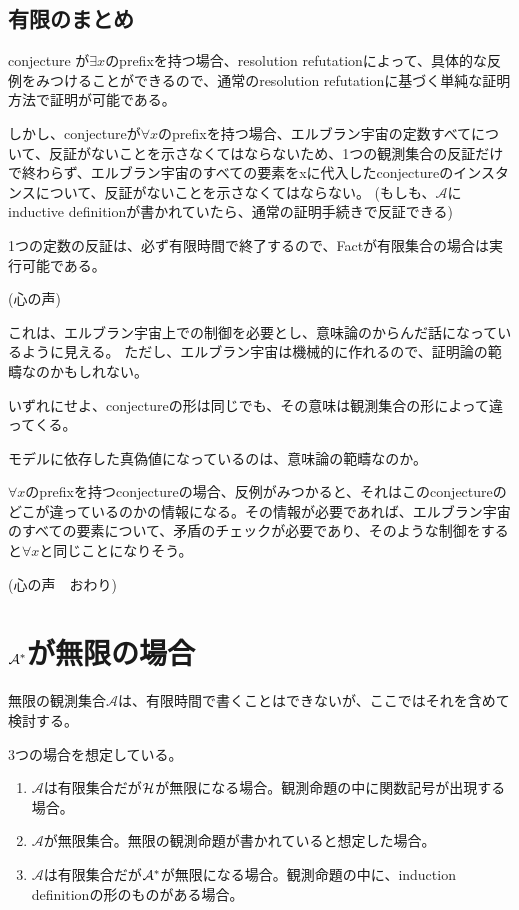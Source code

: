 \documentclass[10pt, oneside]{jarticle}   	%
\begin{document}
\subsection{有限のまとめ}
conjecture が$\exists x $のprefixを持つ場合、resolution refutationによって、具体的な反例をみつけることができるので、通常のresolution refutationに基づく単純な証明方法で証明が可能である。

しかし、conjectureが$\forall x$のprefixを持つ場合、エルブラン宇宙の定数すべてについて、反証がないことを示さなくてはならないため、1つの観測集合の反証だけで終わらず、エルブラン宇宙のすべての要素をxに代入したconjectureのインスタンスについて、反証がないことを示さなくてはならない。
(もしも、$\mathcal{A}$にinductive definitionが書かれていたら、通常の証明手続きで反証できる)

1つの定数の反証は、必ず有限時間で終了するので、Factが有限集合の場合は実行可能である。

(心の声)

これは、エルブラン宇宙上での制御を必要とし、意味論のからんだ話になっているように見える。
ただし、エルブラン宇宙は機械的に作れるので、証明論の範疇なのかもしれない。

いずれにせよ、conjectureの形は同じでも、その意味は観測集合の形によって違ってくる。

モデルに依存した真偽値になっているのは、意味論の範疇なのか。

$\forall x$のprefixを持つconjectureの場合、反例がみつかると、それはこのconjectureのどこが違っているのかの情報になる。その情報が必要であれば、エルブラン宇宙のすべての要素について、矛盾のチェックが必要であり、そのような制御をすると$\forall x$と同じことになりそう。

(心の声　おわり)


\newpage

\section{$\mathcal{A}^{*}$が無限の場合}

無限の観測集合$\mathcal{A}$は、有限時間で書くことはできないが、ここではそれを含めて検討する。

3つの場合を想定している。
\begin{enumerate}
\item $\mathcal{A}$は有限集合だが$\mathcal{H}$が無限になる場合。観測命題の中に関数記号が出現する場合。
\item $\mathcal{A}$が無限集合。無限の観測命題が書かれていると想定した場合。
\item $\mathcal{A}$は有限集合だが$\mathcal{A}^{*}$が無限になる場合。観測命題の中に、induction definitionの形のものがある場合。
\end{enumerate}
\end{document}
